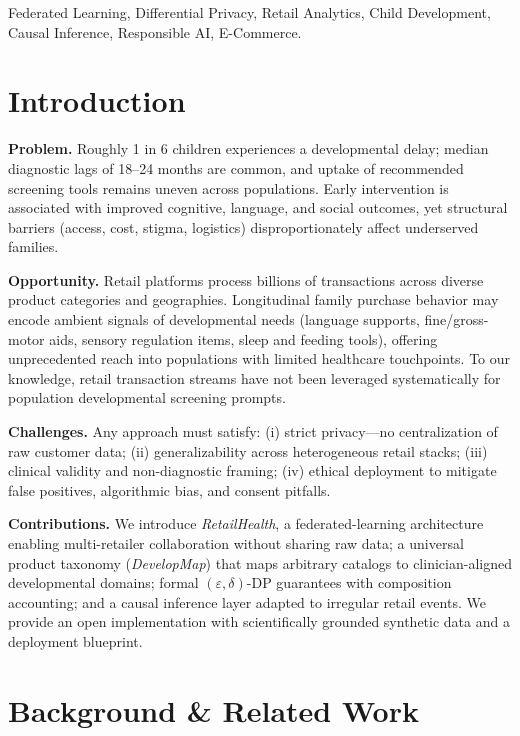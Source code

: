 \documentclass[conference]{IEEEtran}
\newcommand{\eps}{\varepsilon}
\theoremstyle{plain}
\theoremstyle{remark}
\begin{document}
\begin{IEEEkeywords}
Federated Learning, Differential Privacy, Retail Analytics, Child Development, Causal Inference, Responsible AI, E-Commerce.
\end{IEEEkeywords}

\section{Introduction}\label{sec:intro}
\textbf{Problem.} Roughly 1 in 6 children experiences a developmental delay; median diagnostic lags of 18--24 months are common, and uptake of recommended screening tools remains uneven across populations. Early intervention is associated with improved cognitive, language, and social outcomes, yet structural barriers (access, cost, stigma, logistics) disproportionately affect underserved families.

\textbf{Opportunity.} Retail platforms process billions of transactions across diverse product categories and geographies. Longitudinal family purchase behavior may encode ambient signals of developmental needs (language supports, fine/gross-motor aids, sensory regulation items, sleep and feeding tools), offering unprecedented reach into populations with limited healthcare touchpoints. To our knowledge, retail transaction streams have not been leveraged systematically for population developmental screening prompts.

\textbf{Challenges.} Any approach must satisfy: (i) strict privacy---no centralization of raw customer data; (ii) generalizability across heterogeneous retail stacks; (iii) clinical validity and non-diagnostic framing; (iv) ethical deployment to mitigate false positives, algorithmic bias, and consent pitfalls.

\textbf{Contributions.} We introduce \emph{RetailHealth}, a federated-learning architecture enabling multi-retailer collaboration without sharing raw data; a universal product taxonomy (\emph{DevelopMap}) that maps arbitrary catalogs to clinician-aligned developmental domains; formal $(\eps,\delta)$-DP guarantees with composition accounting; and a causal inference layer adapted to irregular retail events. We provide an open implementation with scientifically grounded synthetic data and a deployment blueprint.


\section{Background \& Related Work}
\end{document}
